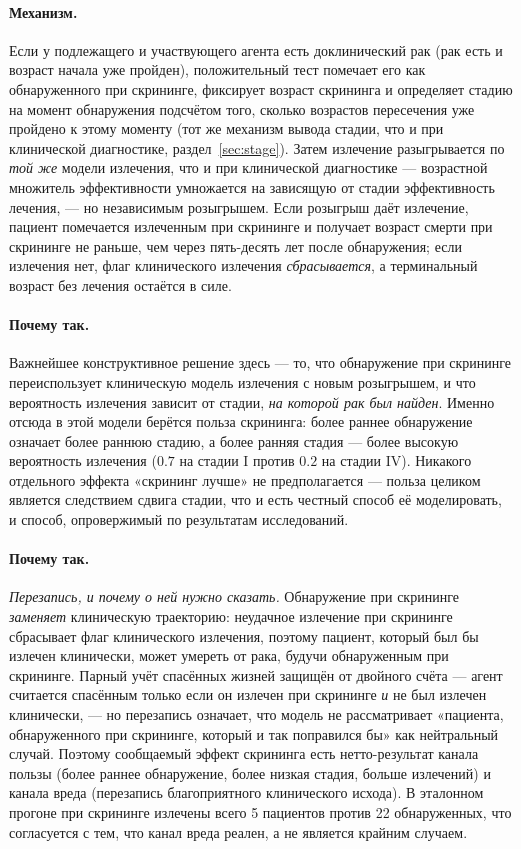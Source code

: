 \documentclass[12pt,a4paper]{article}
\newcommand{\mech}[1]{\paragraph{Механизм.} #1}
\newcommand{\why}[1]{\paragraph{Почему так.} #1}
\begin{document}
\mech{Если у подлежащего и участвующего агента есть доклинический рак (рак есть и возраст начала уже
пройден), положительный тест помечает его как обнаруженного при скрининге, фиксирует возраст скрининга и
определяет стадию на момент обнаружения подсчётом того, сколько возрастов пересечения уже пройдено к этому
моменту (тот же механизм вывода стадии, что и при клинической диагностике, раздел~\ref{sec:stage}). Затем
излечение разыгрывается по \emph{той же} модели излечения, что и при клинической диагностике --- возрастной
множитель эффективности умножается на зависящую от стадии эффективность лечения, --- но независимым
розыгрышем. Если розыгрыш даёт излечение, пациент помечается излеченным при скрининге и получает возраст
смерти при скрининге не раньше, чем через пять-десять лет после обнаружения; если излечения нет, флаг
клинического излечения \emph{сбрасывается}, а терминальный возраст без лечения остаётся в силе.}

\why{Важнейшее конструктивное решение здесь --- то, что обнаружение при скрининге переиспользует
клиническую модель излечения с новым розыгрышем, и что вероятность излечения зависит от стадии, \emph{на
которой рак был найден}. Именно отсюда в этой модели берётся польза скрининга: более раннее обнаружение
означает более раннюю стадию, а более ранняя стадия --- более высокую вероятность излечения ($0.7$ на
стадии I против $0.2$ на стадии IV). Никакого отдельного эффекта «скрининг лучше» не предполагается ---
польза целиком является следствием сдвига стадии, что и есть честный способ её моделировать, и способ,
опровержимый по результатам исследований.}

\why{\emph{Перезапись, и почему о ней нужно сказать.} Обнаружение при скрининге \emph{заменяет} клиническую
траекторию: неудачное излечение при скрининге сбрасывает флаг клинического излечения, поэтому пациент,
который был бы излечен клинически, может умереть от рака, будучи обнаруженным при скрининге. Парный учёт
спасённых жизней защищён от двойного счёта --- агент считается спасённым только если он излечен при
скрининге \emph{и} не был излечен клинически, --- но перезапись означает, что модель не рассматривает
«пациента, обнаруженного при скрининге, который и так поправился бы» как нейтральный случай. Поэтому
сообщаемый эффект скрининга есть нетто-результат канала пользы (более раннее обнаружение, более низкая
стадия, больше излечений) и канала вреда (перезапись благоприятного клинического исхода). В эталонном
прогоне при скрининге излечены всего 5 пациентов против 22 обнаруженных, что согласуется с тем, что канал
вреда реален, а не является крайним случаем.}
\end{document}
